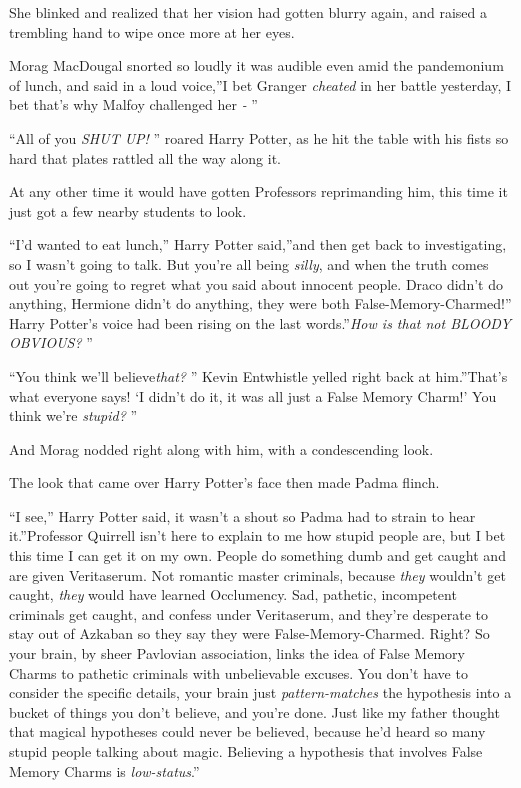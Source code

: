 She blinked and realized that her vision had gotten blurry again, and
raised a trembling hand to wipe once more at her eyes.

Morag MacDougal snorted so loudly it was audible even amid the
pandemonium of lunch, and said in a loud voice,''I bet Granger
\emph{cheated} in her battle yesterday, I bet that's why Malfoy
challenged her \emph{-} ''

``All of you \emph{SHUT UP!} '' roared Harry Potter, as he hit the table
with his fists so hard that plates rattled all the way along it.

At any other time it would have gotten Professors reprimanding him, this
time it just got a few nearby students to look.

``I'd wanted to eat lunch,'' Harry Potter said,''and then get back to
investigating, so I wasn't going to talk. But you're all being
\emph{silly}, and when the truth comes out you're going to regret what
you said about innocent people. Draco didn't do anything, Hermione
didn't do anything, they were both False-Memory-Charmed!'' Harry
Potter's voice had been rising on the last words.''\emph{How is that not
BLOODY OBVIOUS?} ''

``You think we'll believe\emph{that?} '' Kevin Entwhistle yelled right
back at him.''That's what everyone says! `I didn't do it, it was all
just a False Memory Charm!' You think we're \emph{stupid?} ''

And Morag nodded right along with him, with a condescending look.

The look that came over Harry Potter's face then made Padma flinch.

``I see,'' Harry Potter said, it wasn't a shout so Padma had to strain
to hear it.''Professor Quirrell isn't here to explain to me how stupid
people are, but I bet this time I can get it on my own. People do
something dumb and get caught and are given Veritaserum. Not romantic
master criminals, because \emph{they} wouldn't get caught, \emph{they}
would have learned Occlumency. Sad, pathetic, incompetent criminals get
caught, and confess under Veritaserum, and they're desperate to stay out
of Azkaban so they say they were False-Memory-Charmed. Right? So your
brain, by sheer Pavlovian association, links the idea of False Memory
Charms to pathetic criminals with unbelievable excuses. You don't have
to consider the specific details, your brain just \emph{pattern-matches}
the hypothesis into a bucket of things you don't believe, and you're
done. Just like my father thought that magical hypotheses could never be
believed, because he'd heard so many stupid people talking about magic.
Believing a hypothesis that involves False Memory Charms is
\emph{low-status}.''

